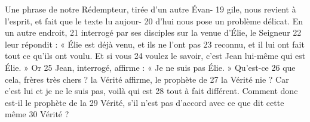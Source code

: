 Une phrase de notre Rédempteur, tirée d'un autre Évan-	 
19	 	gile, nous revient à l'esprit, et fait que le texte lu aujour-	 
20	 	d'hui nous pose un problème délicat. En un autre endroit,	 
21	 	interrogé par ses disciples sur la venue d'Élie, le Seigneur	 
22	 	leur répondit : « Élie est déjà venu, et ils ne l'ont pas	 
23	 	reconnu, et il lui ont fait tout ce qu'ils ont voulu. Et si vous	 
24	 	voulez le savoir, c'est Jean lui-même qui est Élie. » Or	 
25	 	Jean, interrogé, affirme : « Je ne suis pas Élie. » Qu'est-ce	 
26	 	que cela, frères très chers ? la Vérité affirme, le prophète de	 
27	 	la Vérité nie ? Car c'est lui et je ne le suis pas, voilà qui est	 
28	 	tout à fait différent. Comment donc est-il le prophète de la	 
29	 	Vérité, s'il n'est pas d'accord avec ce que dit cette même	 
30	 	Vérité ?